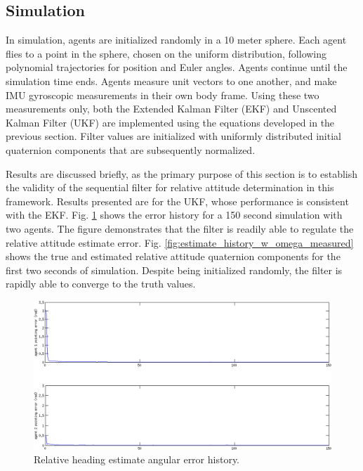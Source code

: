 \documentclass{aiaa-tc}
\begin{document}
\subsection{Simulation}

In simulation, agents are initialized randomly in a 10 meter sphere. Each agent flies to a point in the sphere, chosen on the uniform distribution, following polynomial trajectories for position and Euler angles. Agents continue until the simulation time ends. Agents measure unit vectors to one another, and make IMU gyroscopic measurements in their own body frame. Using these two measurements only, both the Extended Kalman Filter (EKF) and Unscented Kalman Filter (UKF) are implemented using the equations developed in the previous section. Filter values are initialized with uniformly distributed initial quaternion components that are subsequently normalized.

Results are discussed briefly, as the primary purpose of this section is to establish the validity of the sequential filter for relative attitude determination in this framework. Results presented are for the UKF, whose performance is consistent with the EKF. Fig. \ref{fig:error_history_w_omega_measured} shows the error history for a 150 second simulation with two agents. The figure demonstrates that the filter is readily able to regulate the relative attitude estimate error. Fig. \ref{fig:estimate_history_w_omega_measured} shows the true and estimated relative attitude quaternion components for the first two seconds of simulation. Despite being initialized randomly, the filter is rapidly able to converge to the truth values.

\begin{figure}[tb!]
\centering
\includegraphics[width=1.0\textwidth]{error_history_w_omega_measured.png}
\caption{Relative heading estimate angular error history.}
\label{fig:error_history_w_omega_measured}
\end{figure}
\end{document}

